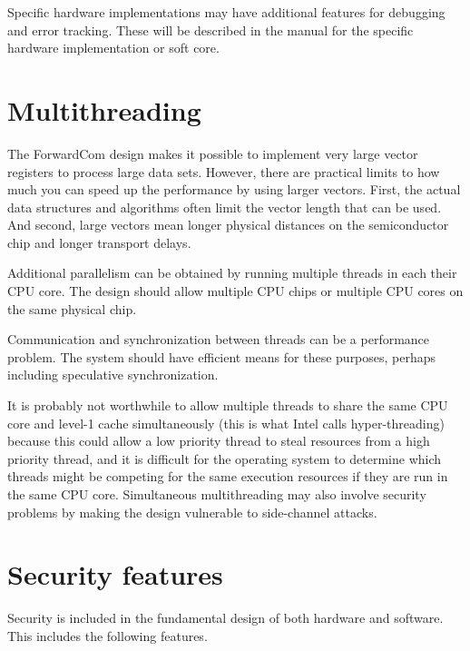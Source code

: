 \documentclass[forwardcom.tex]{subfiles}
\begin{document}
Specific hardware implementations may have additional features for debugging and error tracking. These will be described in the manual for the specific hardware implementation or soft core.
\vv


\section{Multithreading}
The ForwardCom design makes it possible to implement very large vector registers to process large data sets. However, there are practical limits to how much you can speed up the performance by using larger vectors. First, the actual data structures and algorithms often limit the vector length that can be used. And second, large vectors mean longer physical distances on the semiconductor chip and longer transport delays.
\vv

Additional parallelism can be obtained by running multiple threads in each their CPU core. The design should allow multiple CPU chips or multiple CPU cores on the same physical chip.
\vv

Communication and synchronization between threads can be a performance problem. The system should have efficient means for these purposes, perhaps including speculative synchronization.
\vv

It is probably not worthwhile to allow multiple threads to share the same CPU core and level-1 cache simultaneously (this is what Intel calls hyper-threading) because this could allow a low priority thread to steal resources from a high priority thread, and it is difficult for the operating system to determine which threads might be competing for the same execution resources if they are run in the same CPU core. Simultaneous multithreading may also involve security problems by making the design vulnerable to side-channel attacks.
\vv

\section{Security features} \label{securityFeatures}
Security is included in the fundamental design of both hardware and software. This includes the following features.
\end{document}
